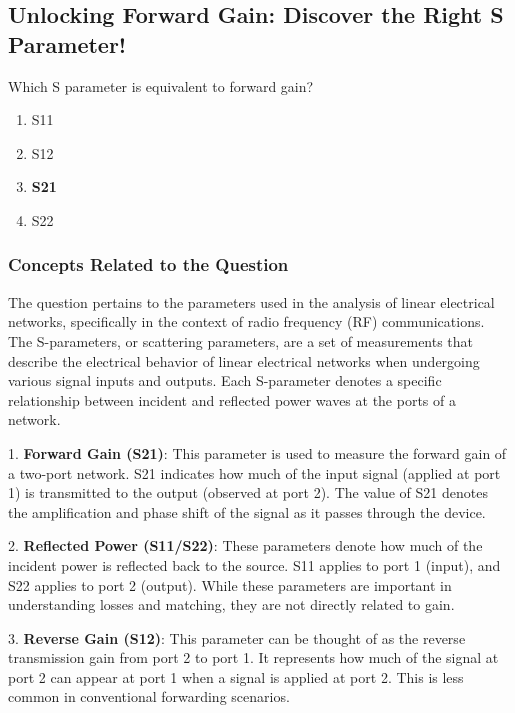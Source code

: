 \subsection{Unlocking Forward Gain: Discover the Right S Parameter!}

\begin{tcolorbox}[colback=gray!10, colframe=black, title=E4B03`]
Which S parameter is equivalent to forward gain? 

\begin{enumerate}[label=\Alph*.]
    \item S11
    \item S12
    \item \textbf{S21}
    \item S22
\end{enumerate} \end{tcolorbox}

\subsubsection*{Concepts Related to the Question}

The question pertains to the parameters used in the analysis of linear electrical networks, specifically in the context of radio frequency (RF) communications. The S-parameters, or scattering parameters, are a set of measurements that describe the electrical behavior of linear electrical networks when undergoing various signal inputs and outputs. Each S-parameter denotes a specific relationship between incident and reflected power waves at the ports of a network.

1. \textbf{Forward Gain (S21)}: This parameter is used to measure the forward gain of a two-port network. S21 indicates how much of the input signal (applied at port 1) is transmitted to the output (observed at port 2). The value of S21 denotes the amplification and phase shift of the signal as it passes through the device.

2. \textbf{Reflected Power (S11/S22)}: These parameters denote how much of the incident power is reflected back to the source. S11 applies to port 1 (input), and S22 applies to port 2 (output). While these parameters are important in understanding losses and matching, they are not directly related to gain.

3. \textbf{Reverse Gain (S12)}: This parameter can be thought of as the reverse transmission gain from port 2 to port 1. It represents how much of the signal at port 2 can appear at port 1 when a signal is applied at port 2. This is less common in conventional forwarding scenarios.

